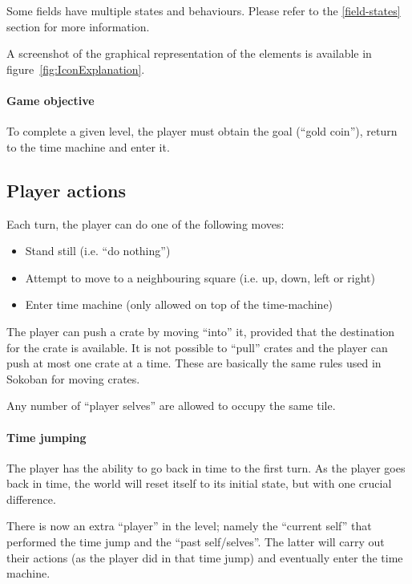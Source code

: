 Some fields have multiple states and behaviours.  Please refer to
the \ref{field-states} section for more information.

A screenshot of the graphical representation of the elements is available
in figure~\ref{fig:IconExplanation}.


\paragraph{Game objective}
To complete a given level, the player must obtain the goal (``gold coin''),
return to the time machine and enter it.

\subsection{Player actions}
\label{player-actions}
Each turn, the player can do one of the following moves:

\begin{itemize}
\item Stand still (i.e. ``do nothing'')
\item Attempt to move to a neighbouring square (i.e. up, down, left or right)
\item Enter time machine (only allowed on top of the time-machine)
\end{itemize}

The player can push a crate by moving ``into'' it, provided that the
destination for the crate is available.  It is not possible to
``pull'' crates and the player can push at most one crate at a time.
These are basically the same rules used in Sokoban for moving crates.

Any number of ``player selves'' are allowed to occupy the same
tile.

\paragraph{Time jumping}
\label{time-jumping}
The player has the ability to go back in time to the first turn.  As
the player goes back in time, the world will reset itself to its
initial state, but with one crucial difference.

There is now an extra ``player'' in the level; namely the ``current
self'' that performed the time jump and the ``past self/selves''.  The
latter will carry out their actions (as the player did in that time
jump) and eventually enter the time machine.

